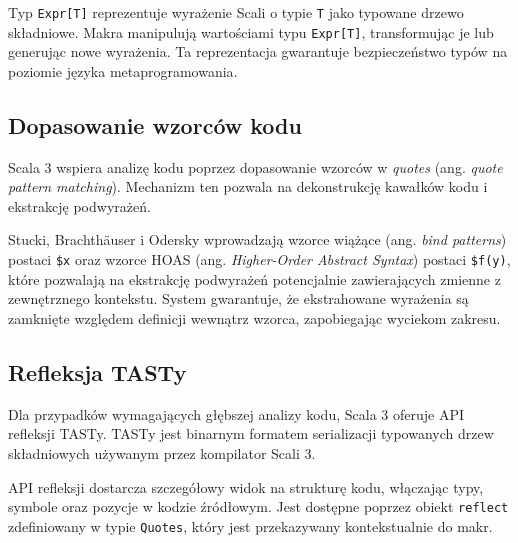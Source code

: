 Typ \texttt{Expr[T]} reprezentuje wyrażenie Scali o typie \texttt{T} jako typowane drzewo składniowe\cite{scala3-reflection,scala3-guides-macros}.
Makra manipulują wartościami typu \texttt{Expr[T]}, transformując je lub generując nowe wyrażenia\cite{scala3-guides-macros}.
Ta reprezentacja gwarantuje bezpieczeństwo typów na poziomie języka metaprogramowania\cite{scala3-reflection}.

\subsection{Dopasowanie wzorców kodu}\label{subsec:dopasowanie-wzorcow-kodu}
Scala 3 wspiera analizę kodu poprzez dopasowanie wzorców w \textit{quotes} (ang. \textit{quote pattern matching})\cite{stucki2020thesis,stucki2021multistage}.
Mechanizm ten pozwala na dekonstrukcję kawałków kodu i ekstrakcję podwyrażeń\cite{stucki2021multistage}.

Stucki, Brachthäuser i Odersky\cite{stucki2021multistage} wprowadzają wzorce wiążące (ang. \textit{bind patterns}) postaci \verb|$x| oraz wzorce HOAS (ang. \textit{Higher-Order Abstract Syntax}) postaci \verb|$f(y)|, które pozwalają na ekstrakcję podwyrażeń potencjalnie zawierających zmienne z zewnętrznego kontekstu\cite{stucki2021multistage}.
System gwarantuje, że ekstrahowane wyrażenia są zamknięte względem definicji wewnątrz wzorca, zapobiegając wyciekom zakresu\cite{stucki2021multistage}.

\subsection{Refleksja TASTy}\label{subsec:refleksja-tasty}
Dla przypadków wymagających głębszej analizy kodu, Scala 3 oferuje API refleksji TASTy\cite{scala3-reflection,epfl-dotty-reflection,scala3-guides-reflection}.
TASTy jest binarnym formatem serializacji typowanych drzew składniowych używanym przez kompilator Scali 3\cite{stucki2020thesis}.

API refleksji dostarcza szczegółowy widok na strukturę kodu, włączając typy, symbole oraz pozycje w kodzie źródłowym\cite{scala3-reflection,scala3-guides-reflection}.
Jest dostępne poprzez obiekt \texttt{reflect} zdefiniowany w typie \texttt{Quotes}, który jest przekazywany kontekstualnie do makr\cite{scala3-reflection,scala3-guides-reflection}.

